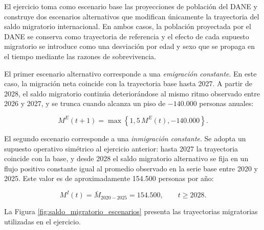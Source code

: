 \documentclass[12pt,a4paper]{article}
\begin{document}
El ejercicio toma como escenario base las proyecciones de población del DANE y construye dos escenarios alternativos que modifican únicamente la trayectoria del saldo migratorio internacional. En ambos casos, la población proyectada por el DANE se conserva como trayectoria de referencia y el efecto de cada supuesto migratorio se introduce como una desviación por edad y sexo que se propaga en el tiempo mediante las razones de sobrevivencia.

El primer escenario alternativo corresponde a una \textit{emigración constante}. En este caso, la migración neta coincide con la trayectoria base hasta 2027. A partir de 2028, el saldo migratorio continúa deteriorándose al mismo ritmo observado entre 2026 y 2027, y se trunca cuando alcanza un piso de $-140{.}000$ personas anuales:

\begin{equation}
\label{eq:ascmig_emig}
M^{E}(t+1)=\max\left\lbrace 1{,}5\,M^{E}(t),-140{.}000\right\rbrace .
\end{equation}

El segundo escenario corresponde a una \textit{inmigración constante}. Se adopta un supuesto operativo simétrico al ejercicio anterior: hasta 2027 la trayectoria coincide con la base, y desde 2028 el saldo migratorio alternativo se fija en un flujo positivo constante igual al promedio observado en la serie base entre 2020 y 2025. Este valor es de aproximadamente 154.500 personas por año:

\begin{equation}
\label{eq:ascmig_inmig}
M^{I}(t)=\bar{M}_{2020-2025}=154{.}500, \qquad t\geq 2028 .
\end{equation}

La Figura \ref{fig:saldo_migratorio_escenarios} presenta las trayectorias migratorias utilizadas en el ejercicio.
\end{document}
